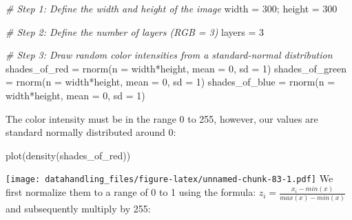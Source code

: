 \documentclass[
  12pt,
]{style/krantz}
\newenvironment{Shaded}{\begin{snugshade}}{\end{snugshade}}
\newcommand{\AttributeTok}[1]{\textcolor[rgb]{0.77,0.63,0.00}{#1}}
\newcommand{\CommentTok}[1]{\textcolor[rgb]{0.56,0.35,0.01}{\textit{#1}}}
\newcommand{\DecValTok}[1]{\textcolor[rgb]{0.00,0.00,0.81}{#1}}
\newcommand{\FunctionTok}[1]{\textcolor[rgb]{0.00,0.00,0.00}{#1}}
\newcommand{\NormalTok}[1]{#1}
\newcommand{\OtherTok}[1]{\textcolor[rgb]{0.56,0.35,0.01}{#1}}
\newcommand{\SpecialCharTok}[1]{\textcolor[rgb]{0.00,0.00,0.00}{#1}}
\begin{document}
\begin{Shaded}
\begin{Highlighting}[]
\CommentTok{\# Step 1: Define the width and height of the image}
\NormalTok{width }\OtherTok{=} \DecValTok{300}\NormalTok{; }
\NormalTok{height }\OtherTok{=} \DecValTok{300}

\CommentTok{\# Step 2: Define the number of layers (RGB = 3)}
\NormalTok{layers }\OtherTok{=} \DecValTok{3}

\CommentTok{\# Step 3: Draw random color intensities from a standard{-}normal distribution}
\NormalTok{shades\_of\_red }\OtherTok{=} \FunctionTok{rnorm}\NormalTok{(}\AttributeTok{n =}\NormalTok{ width}\SpecialCharTok{*}\NormalTok{height, }\AttributeTok{mean =} \DecValTok{0}\NormalTok{, }\AttributeTok{sd =} \DecValTok{1}\NormalTok{)}
\NormalTok{shades\_of\_green }\OtherTok{=} \FunctionTok{rnorm}\NormalTok{(}\AttributeTok{n =}\NormalTok{ width}\SpecialCharTok{*}\NormalTok{height, }\AttributeTok{mean =} \DecValTok{0}\NormalTok{, }\AttributeTok{sd =} \DecValTok{1}\NormalTok{)}
\NormalTok{shades\_of\_blue }\OtherTok{=} \FunctionTok{rnorm}\NormalTok{(}\AttributeTok{n =}\NormalTok{ width}\SpecialCharTok{*}\NormalTok{height, }\AttributeTok{mean =} \DecValTok{0}\NormalTok{, }\AttributeTok{sd =} \DecValTok{1}\NormalTok{)}
\end{Highlighting}
\end{Shaded}

The color intensity must be in the range 0 to 255, however, our values are
standard normally distributed around 0:

\begin{Shaded}
\begin{Highlighting}[]
\FunctionTok{plot}\NormalTok{(}\FunctionTok{density}\NormalTok{(shades\_of\_red))}
\end{Highlighting}
\end{Shaded}

\texttt{[image: datahandling\_files/figure-latex/unnamed-chunk-83-1.pdf]}
We first normalize them to a range of 0 to 1 using the formula:
\(z_i = \frac{x_i - min(x)}{max(x)-min(x)}\)
and subsequently multiply by 255:
\end{document}
